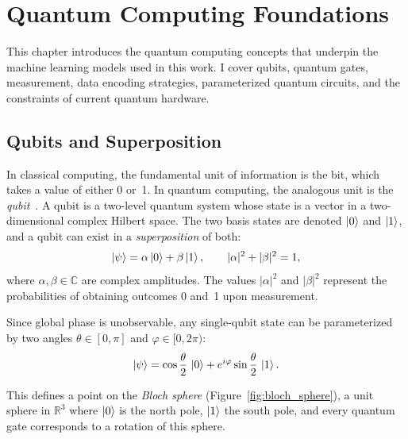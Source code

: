 \chapter{Quantum Computing Foundations}
\label{chap:quantum_foundations}

This chapter introduces the quantum computing concepts that underpin the machine learning models used in this work. I cover qubits, quantum gates, measurement, data encoding strategies, parameterized quantum circuits, and the constraints of current quantum hardware.

\section{Qubits and Superposition}
\label{sec:qubits}

In classical computing, the fundamental unit of information is the bit, which takes a value of either 0 or~1. In quantum computing, the analogous unit is the \emph{qubit}~\cite{nielsen2010quantum}. A qubit is a two-level quantum system whose state is a vector in a two-dimensional complex Hilbert space. The two basis states are denoted $\ket{0}$ and $\ket{1}$, and a qubit can exist in a \emph{superposition} of both:
\begin{equation}
    \ket{\psi} = \alpha \ket{0} + \beta \ket{1}, \qquad |\alpha|^2 + |\beta|^2 = 1,
    \label{eq:superposition}
\end{equation}
where $\alpha, \beta \in \mathbb{C}$ are complex amplitudes. The values $|\alpha|^2$ and $|\beta|^2$ represent the probabilities of obtaining outcomes 0 and~1 upon measurement.

Since global phase is unobservable, any single-qubit state can be parameterized by two angles $\theta \in [0, \pi]$ and $\varphi \in [0, 2\pi)$:
\begin{equation}
    \ket{\psi} = \cos\frac{\theta}{2}\,\ket{0} + e^{i\varphi}\sin\frac{\theta}{2}\,\ket{1}.
    \label{eq:bloch}
\end{equation}

This defines a point on the \emph{Bloch sphere} (Figure~\ref{fig:bloch_sphere}), a unit sphere in $\mathbb{R}^3$ where $\ket{0}$ is the north pole, $\ket{1}$ the south pole, and every quantum gate corresponds to a rotation of this sphere.

